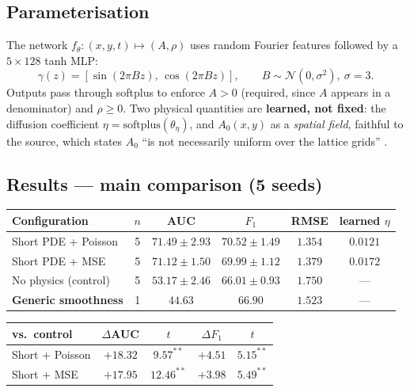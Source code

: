\documentclass[11pt,a4paper]{article}
\begin{document}
\subsection{Parameterisation}
The network $f_\theta:(x,y,t)\mapsto(A,\rho)$ uses random Fourier features
\cite{tancik2020} followed by a $5\times128$ tanh MLP:
\[
\gamma(z) = [\sin(2\pi B z),\, \cos(2\pi B z)], \qquad B \sim \mathcal{N}(0,\sigma^2),\ \sigma = 3 .
\]
Outputs pass through softplus to enforce $A > 0$ (required, since $A$ appears in
a denominator) and $\rho \geq 0$. Two physical quantities are \textbf{learned,
not fixed}: the diffusion coefficient $\eta = \mathrm{softplus}(\theta_\eta)$,
and $A_0(x,y)$ as a \emph{spatial field}, faithful to the source, which states
$A_0$ ``is not necessarily uniform over the lattice grids''
\cite{short2008,wang2020}.

\subsection{Results --- main comparison (5 seeds)}
\begin{center}
\begin{tabular}{lccccc}
\toprule
Configuration & $n$ & AUC & $F_1$ & RMSE & learned $\eta$ \\
\midrule
Short PDE + Poisson & 5 & $\mathbf{71.49\pm2.93}$ & $70.52\pm1.49$ & $1.354$ & $0.0121$ \\
Short PDE + MSE & 5 & $\mathbf{71.12\pm1.50}$ & $69.99\pm1.12$ & $1.379$ & $0.0172$ \\
No physics (control) & 5 & $53.17\pm2.46$ & $66.01\pm0.93$ & $1.750$ & --- \\
\textbf{Generic smoothness} & 1 & $\mathbf{44.63}$ & $66.90$ & $1.523$ & --- \\
\bottomrule
\end{tabular}
\end{center}

\begin{center}
\begin{tabular}{lcccc}
\toprule
vs.\ control & $\Delta$AUC & $t$ & $\Delta F_1$ & $t$ \\
\midrule
Short + Poisson & $\mathbf{+18.32}$ & $9.57^{**}$ & $+4.51$ & $5.15^{**}$ \\
Short + MSE & $+17.95$ & $12.46^{**}$ & $+3.98$ & $5.49^{**}$ \\
\bottomrule
\end{tabular}
\end{center}
\end{document}
